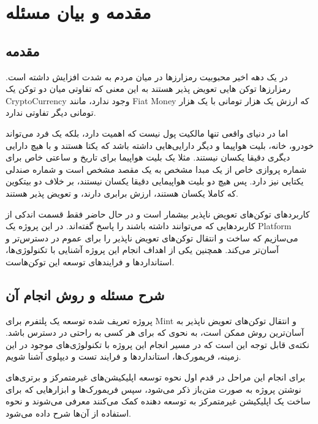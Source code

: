 
\chapter{مقدمه و بیان مسئله}

\section{مقدمه}
در یک دهه اخیر محبوبیت رمزارز‌ها در میان مردم به شدت افزایش داشته است. رمزارزها توکن هایی تعویض پذیر هستند به این معنی که تفاوتی میان دو توکن یک
\gls{CryptoCurrency}
وجود ندارد، مانند
\gls{Fiat Money}
که ارزش یک هزار تومانی با یک هزار تومانی دیگر تفاوتی ندارد.

اما در دنیای واقعی تنها مالکیت پول نیست که اهمیت دارد، بلکه یک فرد می‌تواند خودرو، خانه، بلیت هواپیما و دیگر دارایی‌هایی داشته باشد که یکتا هستند و با هیچ دارایی دیگری دقیقا یکسان نیستند. مثلا یک بلیت هواپیما برای تاریخ و ساعتی خاص برای شماره پروازی خاص از یک مبدا مشخص به یک مقصد مشخص است و شماره صندلی یکتایی نیز دارد. پس هیچ دو بلیت هواپیمایی دقیقا یکسان نیستند، بر خلاف دو بیتکوین که کاملا یکسان هستند، ارزش برابری دارند، و تعویض پذیر هستند.

کاربردهای توکن‌های تعویض ناپذیر بیشمار است و در حال حاضر فقط قسمت اندکی از کاربردهایی که می‌توانند داشته باشند را پاسخ گفته‌اند. در این پروژه یک
\gls{Platform}
می‌سازیم که ساخت و انتقال توکن‌های تعویض ناپذیر را برای عموم در دسترس‌تر و آسان‌تر می‌کند. همچنین یکی از اهداف انجام این پروژه آشنایی با تکنولوژی‌ها، استاندارد‌ها و فرایند‌های توسعه این توکن‌هاست.


\section{شرح مسئله و روش انجام آن}
پروژه تعریف شده توسعه یک پلتفرم برای
\gls{Mint}
و انتقال توکن‌های تعویض ناپذیر به آسان‌ترین روش ممکن است، به نحوی که برای هر کسی به راحتی در دسترس باشد. نکته‌ی قابل توجه‌ این است که در مسیر انجام این پروژه با تکنولوژی‌های موجود در این زمینه، فریمورک‌ها، استاندارد‌ها و فرایند تست و دیپلوی آشنا شویم.

برای انجام این مراحل در قدم اول نحوه توسعه اپلیکیشن‌های غیرمتمرکز و برتری‌های نوشتن پروژه به صورت متن‌باز ذکر می‌شود، سپس فریمورک‌ها و ابزار‌هایی که برای ساخت یک اپلیکیشن غیرمتمرکز به توسعه دهنده کمک می‌کنند معرفی می‌شوند و نحوه استفاده از آن‌ها شرح داده می‌شود.

